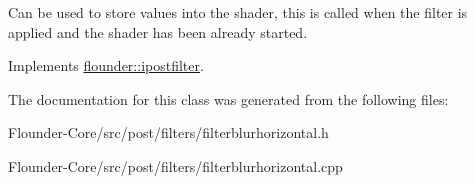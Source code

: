 Can be used to store values into the shader, this is called when the filter is applied and the shader has been already started. 



Implements \hyperlink{classflounder_1_1ipostfilter_a9b658b4672718d5ac36539875bde722e}{flounder\+::ipostfilter}.



The documentation for this class was generated from the following files\+:\begin{DoxyCompactItemize}
\item 
Flounder-\/\+Core/src/post/filters/filterblurhorizontal.\+h\item 
Flounder-\/\+Core/src/post/filters/filterblurhorizontal.\+cpp\end{DoxyCompactItemize}
